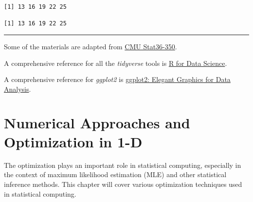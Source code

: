 \documentclass[
  letterpaper,
  DIV=11,
  numbers=noendperiod]{scrreprt}
\newenvironment{Shaded}{\begin{snugshade}}{\end{snugshade}}
\newcommand{\CommentTok}[1]{\textcolor[rgb]{0.37,0.37,0.37}{#1}}
\newcommand{\FunctionTok}[1]{\textcolor[rgb]{0.28,0.35,0.67}{#1}}
\newcommand{\NormalTok}[1]{\textcolor[rgb]{0.00,0.23,0.31}{#1}}
\newcommand{\SpecialCharTok}[1]{\textcolor[rgb]{0.37,0.37,0.37}{#1}}
\begin{document}
\begin{verbatim}
[1] 13 16 19 22 25
\end{verbatim}

\begin{Shaded}
\end{Shaded}

\begin{verbatim}
[1] 13 16 19 22 25
\end{verbatim}

\begin{center}\rule{0.5\linewidth}{0.5pt}\end{center}

Some of the materials are adapted from
\href{https://www.stat.cmu.edu/~ryantibs/statcomp/}{CMU Stat36-350}.

A comprehensive reference for all the \emph{tidyverse} tools is
\href{https://r4ds.had.co.nz/}{R for Data Science}.

A comprehensive reference for \emph{ggplot2} is
\href{https://ggplot2-book.org/}{ggplot2: Elegant Graphics for Data
Analysis}.


\chapter{Numerical Approaches and Optimization in
1-D}\label{numerical-approaches-and-optimization-in-1-d}

\newcommand{\E}{\mathbb{E}}
\newcommand{\R}{\mathbb{R}}
\newcommand{\var}{\mathbb{V}ar}
\newcommand{\cov}{\mathbb{C}ov}
\newcommand{\corr}{\mathbb{C}orr}
\newcommand{\unif}{\operatorname{Unif}}
\newcommand{\geom}{\operatorname{Geom}}
\newcommand{\bet}{\operatorname{Beta}}
\newcommand{\bern}{\operatorname{Bern}}
\newcommand{\iid}{\overset{iid}{\sim}}
\newcommand{\ef}{\operatorname{Eff}}
\newcommand{\htt}{\hat{\theta}}

The optimization plays an important role in statistical computing,
especially in the context of maximum likelihood estimation (MLE) and
other statistical inference methods. This chapter will cover various
optimization techniques used in statistical computing.
\end{document}
